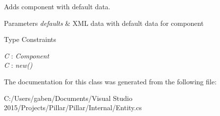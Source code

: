 Adds component with default data. 


\begin{DoxyParams}{Parameters}
{\em defaults} & X\+ML data with default data for component\\
\hline
\end{DoxyParams}
\begin{Desc}
\item[Type Constraints]\begin{description}
\item[{\em C} : {\em Component}]\item[{\em C} : {\em new()}]\end{description}
\end{Desc}


The documentation for this class was generated from the following file\+:\begin{DoxyCompactItemize}
\item 
C\+:/\+Users/gaben/\+Documents/\+Visual Studio 2015/\+Projects/\+Pillar/\+Pillar/\+Internal/Entity.\+cs\end{DoxyCompactItemize}
